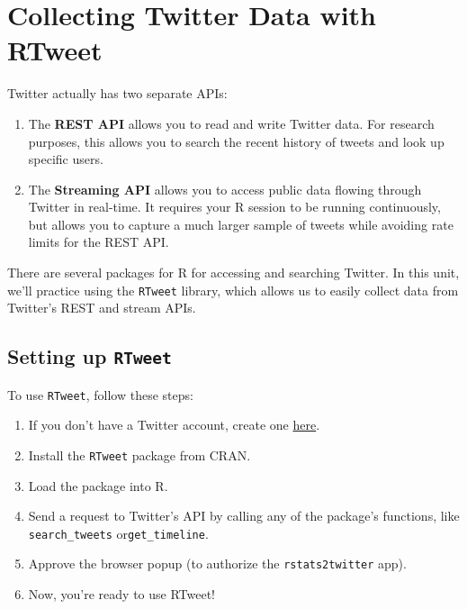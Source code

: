 \documentclass[]{book}
\providecommand{\tightlist}{%
  \setlength{\itemsep}{0pt}\setlength{\parskip}{0pt}}
\begin{document}
\hypertarget{collecting-twitter-data-with-rtweet}{\section{Collecting
Twitter Data with RTweet}\label{collecting-twitter-data-with-rtweet}}

Twitter actually has two separate APIs:

\begin{enumerate}
\def\labelenumi{\arabic{enumi}.}
\tightlist
\item
  The \textbf{REST API} allows you to read and write Twitter data. For
  research purposes, this allows you to search the recent history of
  tweets and look up specific users.
\item
  The \textbf{Streaming API} allows you to access public data flowing
  through Twitter in real-time. It requires your R session to be running
  continuously, but allows you to capture a much larger sample of tweets
  while avoiding rate limits for the REST API.
\end{enumerate}

There are several packages for R for accessing and searching Twitter. In
this unit, we'll practice using the \texttt{RTweet} library, which
allows us to easily collect data from Twitter's REST and stream APIs.

\subsection{\texorpdfstring{Setting up
\texttt{RTweet}}{Setting up RTweet}}\label{setting-up-rtweet}

To use \texttt{RTweet}, follow these steps:

\begin{enumerate}
\def\labelenumi{\arabic{enumi}.}
\tightlist
\item
  If you don't have a Twitter account, create one
  \href{https://twitter.com/i/flow/signup}{here}.
\item
  Install the \texttt{RTweet} package from CRAN.
\item
  Load the package into R.
\item
  Send a request to Twitter's API by calling any of the package's
  functions, like \texttt{search\_tweets} or\texttt{get\_timeline}.
\item
  Approve the browser popup (to authorize the \texttt{rstats2twitter}
  app).
\item
  Now, you're ready to use RTweet!
\end{enumerate}
\end{document}
